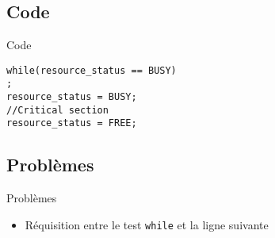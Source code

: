 \begin{frame}[containsverbatim]{\sectitle}
    \def\subsectitle{Code}
    \subsection{\subsectitle}
    \begin{exampleblock}{\subsectitle}
        \begin{verbatim}
while(resource_status == BUSY)
;
resource_status = BUSY;
//Critical section
resource_status = FREE;
        \end{verbatim}
    \end{exampleblock}

    \def\subsectitle{Problèmes}
    \subsection{\subsectitle}
    \begin{alertblock}{\subsectitle}
        \begin{itemize}
            \item Réquisition entre le test \texttt{while} et la ligne suivante
        \end{itemize}
    \end{alertblock}
\end{frame}
\def\sectitle{Test set and Lock}
\section{\subsectitle}
\def\subsectitle{Instruction TSL}
